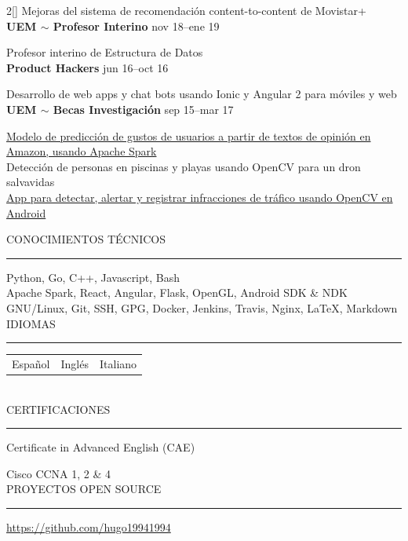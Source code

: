 \documentclass[a4paper, 12pt]{article}
\newenvironment{myparacol}[2][]{%
\begin{paracol}{#2}[#1]\setlength{\parindent}{0pt}}{%
\end{paracol}}
\begin{document}
\begin{sloppypar}
\begin{myparacol}{2}
    Mejoras del sistema de recomendación content-to-content de Movistar+\\

    \textbf{UEM $\sim$ Profesor Interino} \hfill nov 18--ene 19

    Profesor interino de Estructura de Datos\\

    \textbf{Product Hackers} \hfill jun 16--oct 16

    Desarrollo de web apps y chat bots usando Ionic y Angular 2 para móviles y web\\

    \textbf{UEM $\sim$ Becas Investigación} \hfill sep 15--mar 17

    \href{https://www.researchgate.net/publication/314142014_Prediction_of_User_Opinion_for_Products_-_A_Bag-of-Words_and_Collaborative_Filtering_based_Approach}{Modelo de predicción de gustos de usuarios a partir de textos de opinión en Amazon, usando Apache Spark}\\

    Detección de personas en piscinas y playas usando OpenCV para un dron salvavidas\\

    \href{https://github.com/hugo19941994/infrac-coche}{App para detectar, alertar y registrar infracciones de tráfico usando OpenCV en Android}

    \switchcolumn{}

    CONOCIMIENTOS TÉCNICOS
    \vspace{1mm}
    \hrule
    \kern9pt

    Python, Go, C++, Javascript, Bash\\

    Apache Spark, React, Angular, Flask, OpenGL, Android SDK \& NDK\\

    GNU/Linux, Git, SSH, GPG, Docker, Jenkins, Travis, Nginx, \LaTeX, Markdown\\

    IDIOMAS
    \vspace{1mm}
    \hrule
    \kern9pt
    \noindent\begin{tabularx}{\columnwidth}{@{} X X X}
        Español & Inglés & Italiano
    \end{tabularx}
    \\

    CERTIFICACIONES
    \vspace{1mm}
    \hrule
    \kern9pt
    Certificate in Advanced English (CAE)

    Cisco CCNA 1, 2 \& 4
    \\

    \noindent PROYECTOS OPEN SOURCE
    \vspace{1mm}
    \hrule
    \kern9pt
    \url{https://github.com/hugo19941994}
\end{myparacol}
\end{sloppypar}
\end{document}

